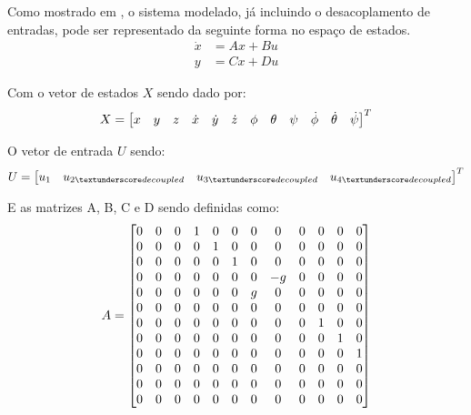 Como mostrado em \cite[p.~63]{Balas2007}, o sistema modelado, já incluindo o desacoplamento de entradas, pode ser representado da seguinte forma no espaço de estados.
\begin{align} \label{eq:space_state_equation_quadcopter}
	\dot{x} &= Ax + Bu \nonumber \\
	y		&= Cx + Du
\end{align}

Com o vetor de estados $X$ sendo dado por:
\begin{equation*}
X=
\left[ \begin{array}{@{}*{12}{c}@{}}
     x & y & z & \dot{x} & \dot{y} & \dot{z} & \phi & \theta & \psi & \dot{\phi} & \dot{\theta} & \dot{\psi}\\
\end{array} \right]^T
\end{equation*}

O vetor de entrada $U$ sendo:
\[ 
	U =
	\begin{bmatrix}
		u_1 & 
		u_{2\textunderscore decoupled} &
		u_{3\textunderscore decoupled} &
		u_{4\textunderscore decoupled}
	\end{bmatrix}^T
\]

E as matrizes A, B, C e D sendo definidas como:
\begin{equation*}
A =
\left[ \begin{array}{@{}*{12}{c}@{}}
     0 & 0 & 0 & 1 & 0 & 0 & 0 & 0  & 0 & 0 & 0 & 0 \\
     0 & 0 & 0 & 0 & 1 & 0 & 0 & 0  & 0 & 0 & 0 & 0 \\
     0 & 0 & 0 & 0 & 0 & 1 & 0 & 0  & 0 & 0 & 0 & 0 \\
     0 & 0 & 0 & 0 & 0 & 0 & 0 & -g & 0 & 0 & 0 & 0 \\
     0 & 0 & 0 & 0 & 0 & 0 & g & 0  & 0 & 0 & 0 & 0 \\
     0 & 0 & 0 & 0 & 0 & 0 & 0 & 0  & 0 & 0 & 0 & 0 \\
     0 & 0 & 0 & 0 & 0 & 0 & 0 & 0  & 0 & 1 & 0 & 0 \\
     0 & 0 & 0 & 0 & 0 & 0 & 0 & 0  & 0 & 0 & 1 & 0 \\
     0 & 0 & 0 & 0 & 0 & 0 & 0 & 0  & 0 & 0 & 0 & 1 \\
     0 & 0 & 0 & 0 & 0 & 0 & 0 & 0  & 0 & 0 & 0 & 0 \\
     0 & 0 & 0 & 0 & 0 & 0 & 0 & 0  & 0 & 0 & 0 & 0 \\
     0 & 0 & 0 & 0 & 0 & 0 & 0 & 0  & 0 & 0 & 0 & 0 \\
\end{array}\right]
\end{equation*}

